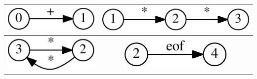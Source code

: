 \documentclass[10pt, conference, compsocconf]{IEEEtran}
\begin{document}
\begin{table}[h]
  \centering
  \begin{tabular}{ | c | c |}
    \hline 
    \begin{minipage}{.2\textwidth}
    \vspace{1 mm}
      \includegraphics[width=\linewidth]{pics/0_tok}
    \end{minipage}
    &
    \begin{minipage}{.2\textwidth}
    \vspace{1 mm}
      \includegraphics[width=\linewidth]{pics/20_tok}
    \end{minipage}
    \\ \hline
    
    \begin{minipage}{.2\textwidth}
    \vspace{1 mm}
      \includegraphics[width=\linewidth]{pics/24_tok}
    \end{minipage}
    &
    \begin{minipage}{.2\textwidth}
    \vspace{1 mm} 
      \includegraphics[width=\linewidth]{pics/35_tok}
    \end{minipage}
    \\ \hline
    

\end{tabular}
\end{table}
\end{document}
